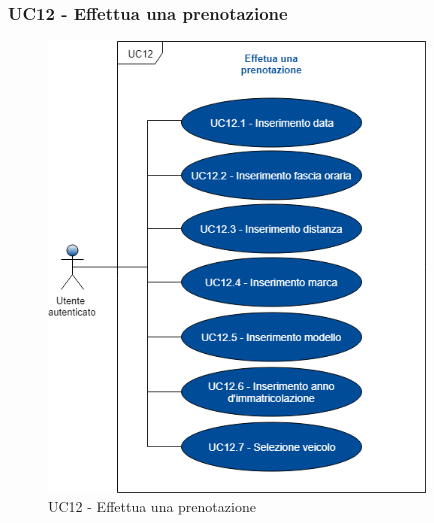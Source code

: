 \subsubsection{UC12 - Effettua una prenotazione}
\begin{figure}[h]
	\includegraphics[width=10cm]{res/images/UC12Effettuaprenotazione.png}
	\centering
	\caption{UC12 - Effettua una prenotazione}
\end{figure}

